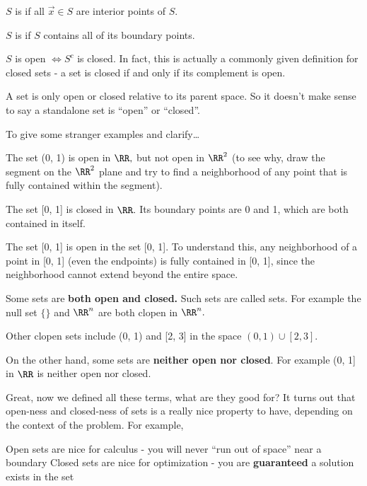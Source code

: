\documentclass{article}
\begin{document}
\begin{definition}
	$S$ is  if all $\vec{x}\in S$ are interior points of $S.$
\end{definition}

\begin{definition}
	$S$ is  if $S$ contains all of its boundary points.
\end{definition}

\begin{fact}
	$S$ is open $\iff S^{c}$ is closed. In fact, this is actually a commonly given definition for closed sets - a set is closed if and only if its complement is open.
\end{fact}

\begin{remark}[Warning]
	A set is only open or closed relative to its parent space. So it doesn't make sense to say a standalone set is ``open'' or ``closed''. 
\end{remark}

\begin{example}
	To give some stranger examples and clarify\ldots
	\begin{enumerate}
		\ii The set (0, 1) is open in $\RR,$ but not open in $\RR^2$ (to see why, draw the segment on the $\RR^2$ plane and try to find a neighborhood of any point that is fully contained within the segment).

		\ii The set [0, 1] is closed in $\RR.$ Its boundary points are 0 and 1, which are both contained in itself.

		\ii The set [0, 1] is open in the set [0, 1]. To understand this, any neighborhood of a point in [0, 1] (even the endpoints) is fully contained in [0, 1], since the neighborhood cannot extend beyond the entire space. 

		\ii Some sets are \textbf{both open and closed.} Such sets are called  sets. For example the null set $\{\}$ and $\RR^n$ are both clopen in $\RR^n.$

		\ii Other clopen sets include (0, 1) and [2, 3] in the space $(0, 1)\cup[2, 3].$ 

		\ii On the other hand, some sets are \textbf{neither open nor closed}. For example (0, 1] in $\RR$ is neither open nor closed.
	\end{enumerate}
\end{example}

Great, now we defined all these terms, what are they good for? It turns out that open-ness and closed-ness of sets is a really nice property to have, depending on the context of the problem. For example, 
\begin{itemize}
	\ii Open sets are nice for calculus - you will never ``run out of space'' near a boundary
	\ii Closed sets are nice for optimization - you are \textbf{guaranteed} a solution exists in the set
\end{itemize}
\end{document}
